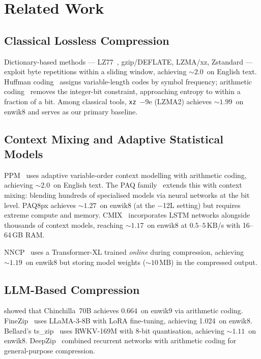 \documentclass[10pt,twocolumn]{article}
\newcommand{\bpb}{\text{bpb}}
\begin{document}
\section{Related Work}
\label{sec:related}

\subsection{Classical Lossless Compression}

Dictionary-based methods --- LZ77~\citep{ziv1977}, gzip/DEFLATE,
LZMA/xz, Zstandard --- exploit byte repetitions within a sliding
window, achieving ${\sim}2.0$\,\bpb{} on English text.
Huffman coding~\citep{huffman1952} assigns variable-length codes by
symbol frequency; arithmetic coding~\citep{witten1987} removes the
integer-bit constraint, approaching entropy to within a fraction of a
bit.  Among classical tools, \texttt{xz}~$-$9e (LZMA2) achieves
${\sim}1.99$\,\bpb{} on enwik8 and serves as our primary baseline.

\subsection{Context Mixing and Adaptive Statistical Models}

PPM~\citep{cleary1984} uses adaptive variable-order context modelling
with arithmetic coding, achieving ${\sim}2.0$\,\bpb{} on English
text.  The PAQ family~\citep{mahoney2005} extends this with context
mixing: blending hundreds of specialised models via neural networks
at the bit level.  PAQ8px achieves ${\sim}1.27$\,\bpb{} on enwik8
(at the $-$12L setting) but requires extreme compute and memory.
CMIX~\citep{cmix2024} incorporates LSTM networks alongside thousands
of context models, reaching ${\sim}1.17$\,\bpb{} on enwik8 at
$0.5$--$5$\,KB/s with 16--64\,GB RAM.

NNCP~\citep{bellard2021} uses a Transformer-XL trained \emph{online}
during compression, achieving ${\sim}1.19$\,\bpb{} on enwik8 but
storing model weights (${\sim}10$\,MB) in the compressed output.

\subsection{LLM-Based Compression}

\citet{deletang2024} showed that Chinchilla~70B achieves
0.664\,\bpb{} on enwik9 via arithmetic coding.  FineZip~\citep{huang2024finezip}
uses LLaMA-3-8B with LoRA fine-tuning, achieving 1.024\,\bpb{} on
enwik8.  Bellard's ts\_zip~\citep{bellard2023} uses RWKV-169M with
8-bit quantisation, achieving ${\sim}1.11$\,\bpb{} on enwik8.
DeepZip~\citep{goyal2020} combined recurrent networks with arithmetic
coding for general-purpose compression.
\end{document}
